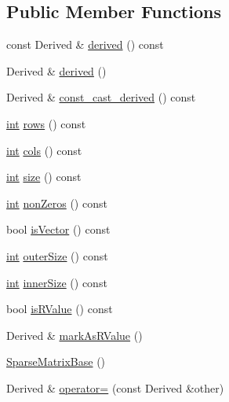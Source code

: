 \subsection*{Public Member Functions}
\begin{DoxyCompactItemize}
\item 
const Derived \& \hyperlink{class_sparse_matrix_base_ace36858cf1b16ff0d3d68d79798d2286}{derived} () const 
\item 
Derived \& \hyperlink{class_sparse_matrix_base_a8bb958e22846489337ecb336c0211908}{derived} ()
\item 
Derived \& \hyperlink{class_sparse_matrix_base_aaaf3fd8709176647d88a82f0d2e35e2d}{const\-\_\-cast\-\_\-derived} () const 
\item 
\hyperlink{ioapi_8h_a787fa3cf048117ba7123753c1e74fcd6}{int} \hyperlink{class_sparse_matrix_base_a31cbd85da1aa1e42714faec11a2bd547}{rows} () const 
\item 
\hyperlink{ioapi_8h_a787fa3cf048117ba7123753c1e74fcd6}{int} \hyperlink{class_sparse_matrix_base_a4fcec997e794a92e143622992a4557cc}{cols} () const 
\item 
\hyperlink{ioapi_8h_a787fa3cf048117ba7123753c1e74fcd6}{int} \hyperlink{class_sparse_matrix_base_a648702d212fd2a32e4fa588f01176882}{size} () const 
\item 
\hyperlink{ioapi_8h_a787fa3cf048117ba7123753c1e74fcd6}{int} \hyperlink{class_sparse_matrix_base_a92b478443db5e505b099a39ec1cc76b9}{non\-Zeros} () const 
\item 
bool \hyperlink{class_sparse_matrix_base_ac4bc161638fa96da1b854ed6c8b8cde7}{is\-Vector} () const 
\item 
\hyperlink{ioapi_8h_a787fa3cf048117ba7123753c1e74fcd6}{int} \hyperlink{class_sparse_matrix_base_ac7cdfac62bd36dea1d756c39a72a8a04}{outer\-Size} () const 
\item 
\hyperlink{ioapi_8h_a787fa3cf048117ba7123753c1e74fcd6}{int} \hyperlink{class_sparse_matrix_base_aba8af3e6bece114ec7eb09175aa5cacc}{inner\-Size} () const 
\item 
bool \hyperlink{class_sparse_matrix_base_a959b8f7a2f7bb5848670acf0f8c52f92}{is\-R\-Value} () const 
\item 
Derived \& \hyperlink{class_sparse_matrix_base_ab59ccbb1646c75d29ec7aa65a4194a90}{mark\-As\-R\-Value} ()
\item 
\hyperlink{class_sparse_matrix_base_a66f9abaf1045c10eeef867775f8394dc}{Sparse\-Matrix\-Base} ()
\item 
Derived \& \hyperlink{class_sparse_matrix_base_adbfea28a5f596cc0c76cc8c45eec12b2}{operator=} (const Derived \&other)

\end{DoxyCompactItemize}
